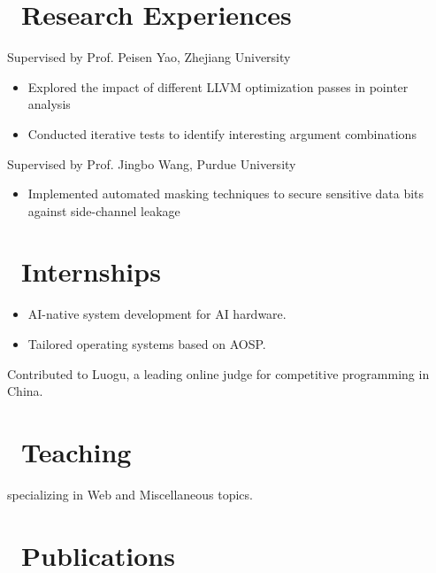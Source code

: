 \documentclass{resume}
\begin{document}
\section{\faSearch\ Research Experiences}
Supervised by Prof. Peisen Yao, Zhejiang University  
\begin{itemize}[itemsep=0.5ex]  
  \item Explored the impact of different LLVM optimization passes in pointer analysis  
  \item Conducted iterative tests to identify interesting argument combinations  
\end{itemize}

Supervised by Prof. Jingbo Wang, Purdue University
\begin{itemize}[itemsep=0.5ex]  
  \item Implemented automated masking techniques to secure sensitive data bits against side-channel leakage  
\end{itemize}

\section{\faUsers\ Internships}
\begin{itemize}
  \item AI-native system development for AI hardware.
  \item Tailored operating systems based on AOSP.
\end{itemize}

Contributed to Luogu, a leading online judge for competitive programming in China.

\section{\faBook\ Teaching}
specializing in Web and Miscellaneous topics.

\section{\faBookmarkO\ Publications}
\end{document}
